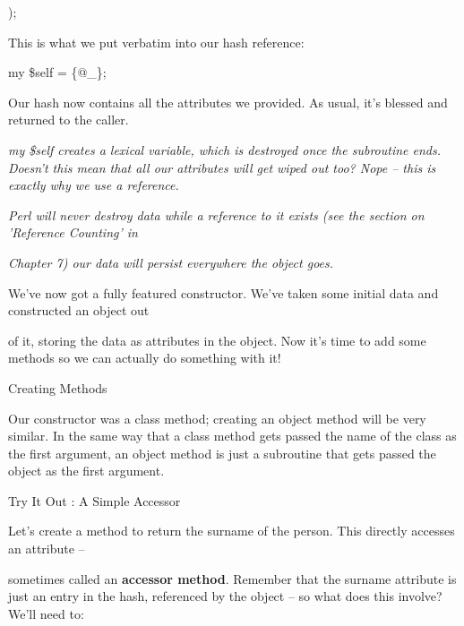 \documentclass[a4paper,11pt]{book}
\begin{document}
\noindent );

\noindent 

\noindent 

\noindent This is what we put verbatim into our hash reference:

\noindent 

\noindent my \$self = \{@\_\};

\noindent 

\noindent Our hash now contains all the attributes we provided. As usual, it's blessed and returned to the caller.

\noindent 

\noindent 

\noindent \textit{my \$self creates a lexical variable, which is destroyed once the subroutine ends. Doesn't this mean that all our attributes will get wiped out too? Nope -- this is exactly why we use a reference.}

\noindent \textit{Perl will never destroy data while a reference to it exists (see the section on 'Reference Counting' in}

\noindent \textit{Chapter 7) our data will persist everywhere the object goes.}

\noindent 

\noindent 

\noindent We've now got a fully featured constructor. We've taken some initial data and constructed an object out

\noindent of it, storing the data as attributes in the object. Now it's time to add some methods so we can actually do something with it!

\noindent 

\noindent Creating Methods

\noindent 

\noindent Our constructor was a class method; creating an object method will be very similar. In the same way that a class method gets passed the name of the class as the first argument, an object method is just a subroutine that gets passed the object as the first argument.

\noindent 

\noindent Try It Out : A Simple Accessor

\noindent Let's create a method to return the surname of the person. This directly accesses an attribute --

\noindent sometimes called an \textbf{accessor method}. Remember that the surname attribute is just an entry in the hash, referenced by the object -- so what does this involve? We'll need to:
\end{document}
